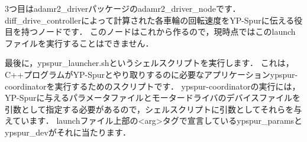 \documentclass[{../../master}]{subfiles}
\begin{document}
3つ目は\textsf{adamr2\_driver}パッケージの\textsf{adamr2\_driver\_node}です．
\textsf{diff\_drive\_controller}によって計算された各車輪の回転速度をYP-Spurに伝える役目を持つノードです．
このノードはこれから作るので，現時点ではこのlaunchファイルを実行することはできません．

最後に，\textsf{ypspur\_launcher.sh}というシェルスクリプトを実行します．
これは，C++プログラムがYP-Spurとやり取りするのに必要なアプリケーション\textsf{ypspur-coordinator}を実行するためのスクリプトです．
\textsf{ypspur-coordinator}の実行には，YP-Spurに与えるパラメータファイルとモータードライバのデバイスファイルを引数として指定する必要があるので，シェルスクリプトに引数としてそれらを与えています．
launchファイル上部の\textsf{<arg>}タグで宣言している\textsf{ypspur\_params}と\textsf{ypspur\_dev}がそれに当たります．
\end{document}
